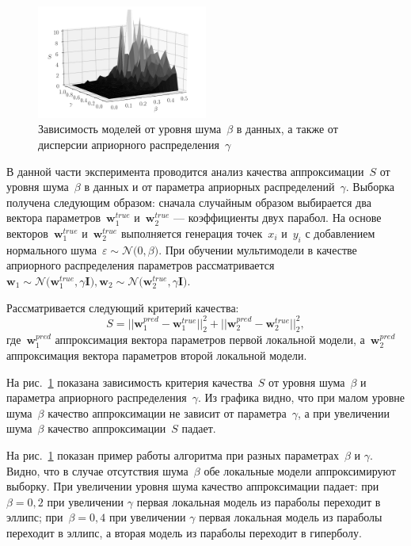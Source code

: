 \documentclass[12pt, twoside]{article}
\numberwithin{equation}{section}
\begin{document}
\begin{figure}[h!t]\center
\includegraphics[width=0.5\textwidth]{figures/3dplot}
\caption{Зависимость моделей от уровня шума~$\beta$ в данных, а также от дисперсии априорного распределения~$\gamma$}
\label{ce:fig5}
\end{figure}
В данной части эксперимента проводится анализ качества аппроксимации~$S$ от уровня шума~$\beta$ в данных и от параметра априорных распределений~$\gamma$. Выборка получена следующим образом: сначала случайным образом выбирается два вектора параметров~$\mathbf{w}^{true}_{1}$ и~$\mathbf{w}^{true}_{2}$ --- коэффициенты двух парабол. На основе векторов~$\mathbf{w}^{true}_{1}$ и~$\mathbf{w}^{true}_{2}$ выполняется генерация точек~$x_i$ и~$y_i$ с добавлением нормального шума~$\varepsilon\sim \mathcal{N}\bigr(0, \beta\bigr)$. При обучении мультимодели в качестве априорного распределения параметров рассматривается~$\mathbf{w}_1\sim\mathcal{N}\bigr(\mathbf{w}^{true}_{1}, \gamma\mathbf{I}\bigr),\mathbf{w}_2\sim\mathcal{N}\bigr(\mathbf{w}^{true}_{2}, \gamma\mathbf{I}\bigr)$.

Рассматривается следующий критерий качества:
\[
S = ||\mathbf{w}^{pred}_{1} - \mathbf{w}^{true}_{1}||^{2}_{2} + ||\mathbf{w}^{pred}_{2} - \mathbf{w}^{true}_{2}||^{2}_{2},
\]
где~$\mathbf{w}^{pred}_{1}$ аппроксимация вектора параметров первой локальной модели, а~$\mathbf{w}^{pred}_{2}$ аппроксимация вектора параметров второй локальной модели.

На рис.~\ref{ce:fig5} показана зависимость критерия качества~$S$ от уровня шума~$\beta$ и параметра априорного распределения~$\gamma$. Из графика видно, что при малом уровне шума~$\beta$ качество аппроксимации не зависит от параметра~$\gamma$, а при увеличении шума~$\beta$ качество аппроксимации~$S$ падает.

На рис.~\ref{ce:fig5} показан пример работы алгоритма при разных параметрах~$\beta$ и $\gamma$. Видно, что в случае отсутствия шума~$\beta$ обе локальные модели аппроксимируют выборку. При увеличении уровня шума качество аппроксимации падает: при~$\beta=0{,}2$ при увеличении $\gamma$ первая локальная модель из параболы переходит в эллипс; при~$\beta=0{,}4$ при увеличении  $\gamma$ первая локальная модель из параболы переходит в эллипс, а вторая модель из параболы переходит в гиперболу.
\end{document}
